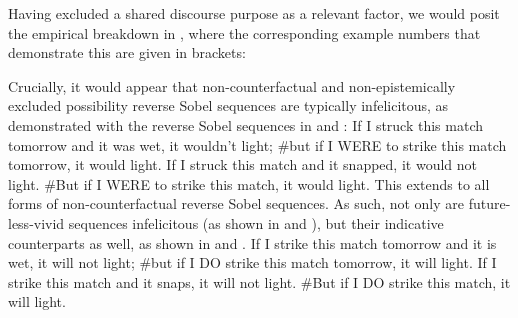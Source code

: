 Having excluded a shared discourse purpose as a relevant factor, we would posit the empirical breakdown in , where the corresponding example numbers that demonstrate this are given in brackets:%
\begin{table}[!htb]
\end{table}

Crucially, it would appear that non-counterfactual and non-epistemically excluded possibility reverse Sobel sequences are typically infelicitous, as demonstrated with the reverse Sobel sequences in  and :
\ex{}
    If I struck this match tomorrow and it was wet, it wouldn't light; \#but if I \MakeUppercase{were} to strike this match tomorrow, it would light.
\xe
\ex{}If I struck this match and it snapped, it would not light. \#But if I \MakeUppercase{were} to strike this match, it would light.
\xe
This extends to all forms of non-counterfactual reverse Sobel sequences. As such, not only are future-less-vivid sequences infelicitous (as shown in  and ), but their indicative counterparts as well, as shown in  and .
\ex{}
    If I strike this match tomorrow and it is wet, it will not light; \#but if I \MakeUppercase{do} strike this match tomorrow, it will light.
\xe
\ex{}If I strike this match and it snaps, it will not light. \#But if I \MakeUppercase{do} strike this match, it will light.
\xe

